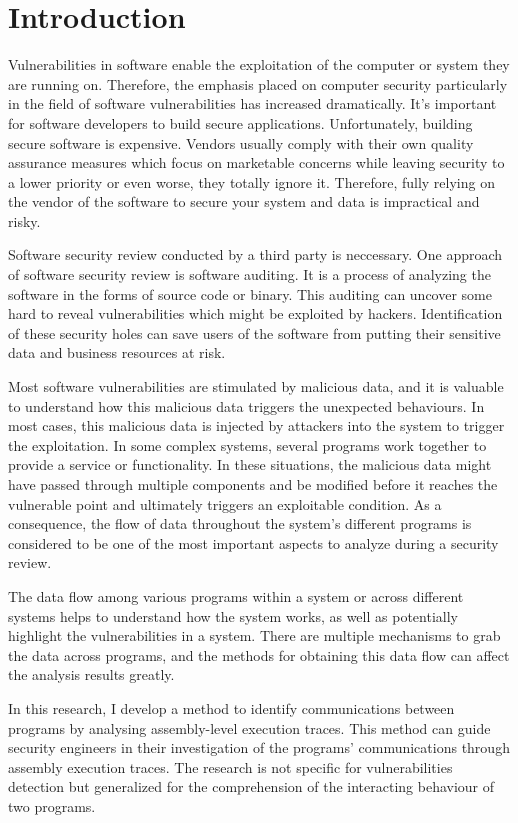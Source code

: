 \documentclass[12pt,oneside]{book}
\newcommand\startfirstchapter[1]{\chapter{#1}}
\begin{document}


\newpage

	\startfirstchapter{Introduction}
\label{chapter:introduction}
Vulnerabilities in software enable the exploitation of the computer or system they are running on. Therefore, the emphasis placed on computer security particularly in the field of software vulnerabilities has increased dramatically. It's important for software developers to build secure applications. Unfortunately, building secure software is expensive. Vendors usually comply with their own quality assurance measures which focus on marketable concerns while leaving security to a lower priority or even worse, they totally ignore it. Therefore, fully relying on the vendor of the software to secure your system and data is impractical and risky. \cite{dowd_art_2006}

Software security review conducted by a third party is neccessary. One approach of software security review is software auditing. It is a process of analyzing the software in the forms of source code or binary. This auditing can uncover some hard to reveal vulnerabilities which might be exploited by hackers. Identification of these security holes can save users of the software from putting their sensitive data and business resources at risk. \cite{dowd_art_2006}

Most software vulnerabilities are stimulated by malicious data, and it is valuable to understand how this malicious data triggers the unexpected behaviours. In most cases, this malicious data is injected by attackers into the system to trigger the exploitation. In some complex systems, several programs work together to provide a service or functionality. In these situations, the malicious data might have passed through multiple components and be modified before it reaches the vulnerable point and ultimately triggers an exploitable condition. As a consequence, the flow of data throughout the system's different programs is considered to be one of the most important aspects to analyze during a security review. \cite{dowd_art_2006}

The data flow among various programs within a system or across different systems helps to understand how the system works, as well as potentially highlight the vulnerabilities in a system. There are multiple mechanisms to grab the data across programs, and the methods for obtaining this data flow can affect the analysis results greatly. 

In this research, I develop a method to identify communications between programs by analysing assembly-level execution traces. This method can guide security engineers in their investigation of the programs' communications through assembly execution traces. The research is not specific for vulnerabilities detection but generalized for the comprehension of the interacting behaviour of two programs.
\end{document}
